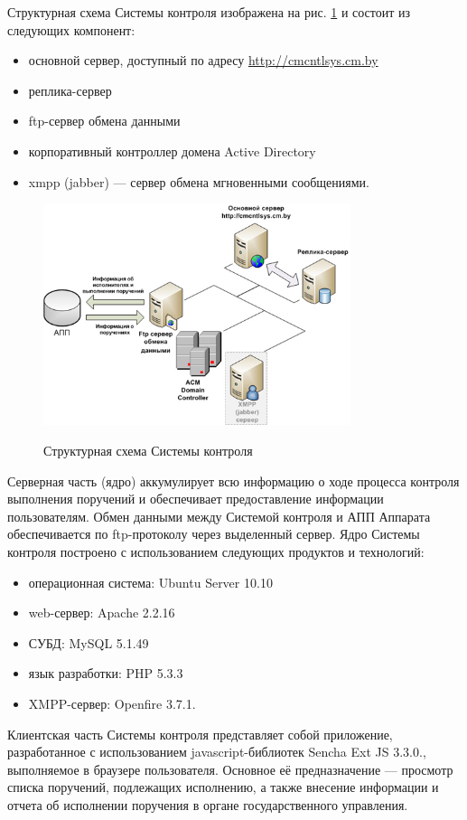 \documentclass[10pt, a5paper]{article}
\begin{document}
Структурная схема Системы контроля изображена на рис. \ref{R2} и состоит из следующих компонент:

\begin{itemize}
  \item основной сервер, доступный по адресу \url{http://cmcntlsys.cm.by}
  \item реплика-сервер
  \item ftp-сервер обмена данными
  \item корпоративный контроллер домена Active Directory
  \item xmpp (jabber) --- сервер обмена мгновенными сообщениями.
\end{itemize}

\begin{figure}[htpb]
  \centering
  \includegraphics[width=9cm]{110_2012_w_cmcntrlsys_figure2_1.jpg}
  \label{R2}
\caption{Структурная схема Системы контроля}
\end{figure}
Серверная часть (ядро) аккумулирует всю информацию о ходе процесса контроля выполнения поручений и обеспечивает предоставление информации пользователям.  Обмен данными между Системой контроля и АПП Аппарата обеспечивается по ftp-протоколу через выделенный сервер. Ядро Системы контроля построено с использованием следующих продуктов и технологий:

\begin{itemize}
  \item операционная система: Ubuntu Server 10.10
  \item web-сервер: Apache 2.2.16
  \item СУБД: MySQL 5.1.49
  \item язык разработки: PHP 5.3.3
  \item XMPP-сервер: Openfire 3.7.1.
\end{itemize}

Клиентская часть Системы контроля представляет собой приложение, разработанное с использованием javascript-библиотек Sencha Ext JS 3.3.0., выполняемое в браузере пользователя. Основное её предназначение --- просмотр списка поручений, подлежащих исполнению, а также внесение информации и отчета об исполнении поручения в органе государственного управления.
\end{document}
